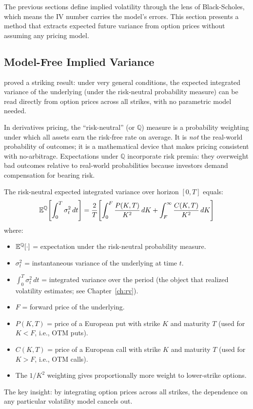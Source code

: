 The previous sections define implied volatility through the lens of Black-Scholes, which means the IV number carries the model's errors.
This section presents a method that extracts expected future variance from option prices without assuming any pricing model.

\subsection{Model-Free Implied Variance}
\label{sec:model-free}

\citet{BrittenJones2000} proved a striking result: under very general conditions, the expected integrated variance of the underlying (under the risk-neutral probability measure) can be read directly from option prices across all strikes, with no parametric model needed.

\begin{prereq}
In derivatives pricing, the ``risk-neutral'' (or $\mathbb{Q}$) measure is a probability weighting under which all assets earn the risk-free rate on average.
It is \emph{not} the real-world probability of outcomes; it is a mathematical device that makes pricing consistent with no-arbitrage.
Expectations under $\mathbb{Q}$ incorporate risk premia: they overweight bad outcomes relative to real-world probabilities because investors demand compensation for bearing risk.
\end{prereq}

\begin{keyresult}
\label{res:model-free}
The risk-neutral expected integrated variance over horizon $[0, T]$ equals:
\begin{equation}
  \mathbb{E}^{\mathbb{Q}}\!\left[\int_0^T \sigma_t^2\,dt\right]
  = \frac{2}{T}\!\left[\int_0^{F} \frac{P(K,T)}{K^2}\,dK
  + \int_{F}^{\infty} \frac{C(K,T)}{K^2}\,dK\right]
  \label{eq:model-free-var}
\end{equation}
where:
\begin{itemize}[nosep]
  \item $\mathbb{E}^{\mathbb{Q}}[\cdot]$ = expectation under the risk-neutral probability measure.
  \item $\sigma_t^2$ = instantaneous variance of the underlying at time $t$.
  \item $\int_0^T \sigma_t^2\,dt$ = integrated variance over the period (the object that realized volatility estimates; see Chapter~\ref{ch:rv}).
  \item $F$ = forward price of the underlying.
  \item $P(K,T)$ = price of a European put with strike $K$ and maturity $T$ (used for $K < F$, i.e., OTM puts).
  \item $C(K,T)$ = price of a European call with strike $K$ and maturity $T$ (used for $K > F$, i.e., OTM calls).
  \item The $1/K^2$ weighting gives proportionally more weight to lower-strike options.
\end{itemize}
The key insight: by integrating option prices across all strikes, the dependence on any particular volatility model cancels out.
\end{keyresult}

